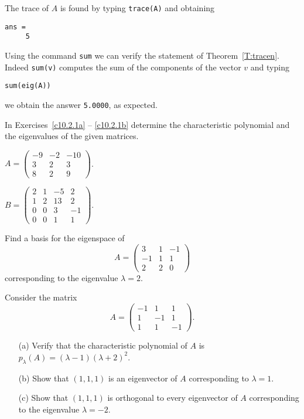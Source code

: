 The trace of $A$ is found by typing {\tt trace(A)} and obtaining
\begin{verbatim} 
ans =
     5
\end{verbatim} 

Using the \Matlab command {\tt sum} we can verify the statement
of Theorem~\ref{T:tracen}.  Indeed {\tt sum(v)} computes the sum 
of the components of the vector $v$ and typing
\begin{verbatim}
sum(eig(A))
\end{verbatim}
we obtain the answer {\tt 5.0000}, as expected.

\EXER

\TEXER

\noindent In Exercises~\ref{c10.2.1a} -- \ref{c10.2.1b} determine the 
characteristic polynomial and the eigenvalues of the given matrices.
\begin{exercise} \label{c10.2.1a}
$A = \left(\begin{array}{rrr} -9 & -2 & -10 \\ 3 & 2 & 3 \\
8 & 2 & 9 \end{array}\right)$. 
\end{exercise}
\begin{exercise} \label{c10.2.1b}
$B = \left(\begin{array}{rrrr} 2 & 1 & -5 & 2 \\ 1 & 2 & 13 & 2 \\
0 & 0 & 3 & -1 \\ 0 & 0 & 1 & 1 \end{array}\right)$.
\end{exercise}

\begin{exercise} \label{c10.2.2}
Find a basis for the eigenspace of 
\[
A = \left(\begin{array}{rrr} 3 & 1 & -1 \\ -1 & 1 & 1 \\ 2 & 2 & 0 
\end{array}\right)
\]
corresponding to the eigenvalue $\lambda=2$.
\end{exercise}

\begin{exercise} \label{c10.2.3}
Consider the matrix  
\[
A = \left(\begin{array}{rrr} -1 & 1 & 1 \\ 1 & -1 & 1 \\ 1 & 1 & -1 
\end{array}\right).
\]
\begin{itemize}
\item[(a)] Verify that the characteristic polynomial of $A$ is
 $p_\lambda(A)=(\lambda-1)(\lambda+2)^2$.
\item[(b)] Show that $(1,1,1)$ is an eigenvector of $A$ corresponding to 
$\lambda=1$.
\item[(c)] Show that $(1,1,1)$ is orthogonal to every eigenvector 
of $A$ corresponding to the eigenvalue $\lambda=-2$.
\end{itemize}
\end{exercise}

